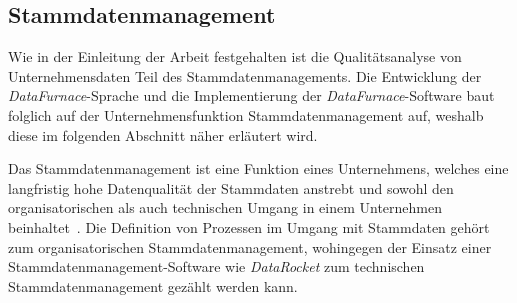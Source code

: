 \documentclass[
  language=german, %
  type=bachelor,%
  ngerman
]{isthesis}
\begin{document}
\begin{content}



	\section{Stammdatenmanagement}

	Wie in der Einleitung der Arbeit festgehalten ist die Qualitätsanalyse von
	Unternehmensdaten Teil des Stammdatenmanagements. Die Entwicklung der
	\textit{DataFurnace}-Sprache und die Implementierung der
	\textit{DataFurnace}-Software baut folglich auf der Unternehmensfunktion
	Stammdatenmanagement auf, weshalb diese im folgenden Abschnitt näher erläutert
	wird.

	Das Stammdatenmanagement ist eine Funktion eines Unternehmens, welches eine
	langfristig hohe Datenqualität der Stammdaten anstrebt und sowohl den
	organisatorischen als auch technischen Umgang in einem Unternehmen
	beinhaltet~\cite[][S.  2]{legner2007stammdaten}.  Die Definition von
	Prozessen im Umgang mit Stammdaten gehört \zB{} zum organisatorischen
	Stammdatenmanagement, wohingegen der Einsatz einer Stammdatenmanagement-Software
	wie \textit{DataRocket} zum technischen Stammdatenmanagement gezählt werden
	kann.  


\end{content}
\end{document}
